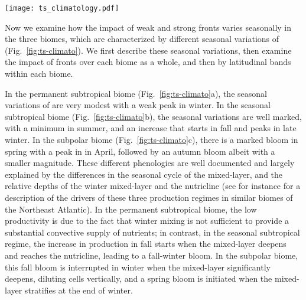 \begin{figure*}
  \texttt{[image: ts\_climatology.pdf]}
  \caption{
    Seasonal impact of fronts on  in the permanent subtropical biome (1st column), in the seasonal subtropical biome (2nd column) and in the subpolar biome (3rd column).
    (a-b-c)  median values (top row) over weak fronts (blue), strong fronts (green) and background (red).
    The differences between the curves show the local impact at the scale of fronts.
    (d-e-f) Surface fraction occupied by weak fronts and strong fronts.
    (g-h-i) Global  surplus due to weak fronts and strong fronts at the scale of the biome.
    The surplus accounts for the local excess and for the number of fronts (see method).
    The plain lines represent the climatological mean, and the envelopes mark the standard deviation over the period 2000--2020.
     is more strongly enhanced over strong fronts than over weak fronts, but weak fronts are more numerous than strong fronts, resulting in a  surplus that can be reversed.
  }%
  \label{fig:ts-climato}
\end{figure*}

Now we examine how the impact of weak and strong fronts varies seasonally in the three biomes, which are characterized by different seasonal variations of  (Fig.~\ref{fig:ts-climato}).
We first describe these seasonal variations, then examine the impact of fronts over each biome as a whole, and then by latitudinal bands within each biome.

In the permanent subtropical biome (Fig.~\ref{fig:ts-climato}a), the seasonal variations of  are very modest with a weak peak in winter.
In the seasonal subtropical biome (Fig.~\ref{fig:ts-climato}b), the seasonal variations are well marked, with a minimum in summer, and an increase that starts in fall and peaks in late winter.
In the subpolar biome (Fig.~\ref{fig:ts-climato}c), there is a marked bloom in spring with a peak in  in April, followed by an autumn bloom albeit with a smaller magnitude.
These different phenologies are well documented and largely explained by the differences in the seasonal cycle of the mixed-layer, and the relative depths of the winter mixed-layer and the nutricline (see for instance \textcite{levy_2005a} for a description of the drivers of these three production regimes in similar biomes of the Northeast Atlantic).
In the permanent subtropical biome, the low productivity is due to the fact that winter mixing is not sufficient to provide a substantial convective supply of nutrients; in contrast, in the seasonal subtropical regime, the increase in production in fall starts when the mixed-layer deepens and reaches the nutricline, leading to a fall-winter bloom.
In the subpolar biome, this fall bloom is interrupted in winter when the mixed-layer significantly deepens, diluting cells vertically, and a spring bloom is initiated when the mixed-layer stratifies at the end of winter.


